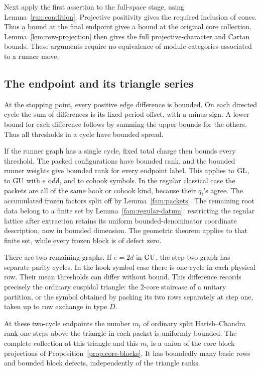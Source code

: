 Next apply the first assertion to the full-space stage, using
Lemma~\ref{run:condition}.  Projective positivity gives the
required inclusion of cones.  Thus a bound at the final
endpoint gives a bound at the original core collection.
Lemma~\ref{lem:row-projection} then gives the full
projective-character and Cartan bounds.  These arguments
require no equivalence of module categories associated to a
runner move.

\subsection{The endpoint and its triangle series}

At the stopping point, every positive edge difference is
bounded.  On each directed cycle the sum of differences is
its fixed period offset, with a minus sign.  A lower bound
for each difference follows by summing the upper bounds
for the others.  Thus all thresholds in a cycle have bounded
spread.

If the runner graph has a single cycle, fixed total charge
then bounds every threshold.  The packed configurations have
bounded rank, and the bounded runner weights give bounded
rank for every endpoint label.  This applies to \(\operatorname{GL}\),
to \(\operatorname{GU}\) with \(e\) odd, and to cohook symbols.
In the regular classical case the packets are all of the
same hook or cohook kind, because their \(q_i\)'s agree.
The accumulated frozen factors split off by
Lemma~\ref{fam:packets}.  The remaining root data belong to
a finite set by Lemma~\ref{fam:regular-datum}: restricting
the regular lattice after extraction retains its uniform
bounded-denominator coordinate description, now in bounded
dimension.  The geometric theorem applies to that finite
set, while every frozen block is of defect zero.

There are two remaining graphs.  If \(e=2d\) in \(\operatorname{GU}\),
the step-two graph has separate parity cycles.  In the hook
symbol case there is one cycle in each physical row.
Their mean thresholds can differ without bound.  This
difference records precisely the ordinary cuspidal triangle:
the \(2\)-core staircase of a unitary partition, or the
symbol obtained by packing its two rows separately at
step one, taken up to row exchange in type \(D\).

\begin{lemma}\label{run:triangle-endpoint}
At these two-cycle endpoints the number \(m_i\) of ordinary
split Harish--Chandra rank-one steps above the triangle in
each packet is uniformly bounded.
The complete collection at this triangle and this \(m_i\)
is a union of the core block projections of
Proposition~\ref{prop:core-blocks}.  It has boundedly many
basic rows and bounded block defects, independently of
the triangle ranks.
\end{lemma}

